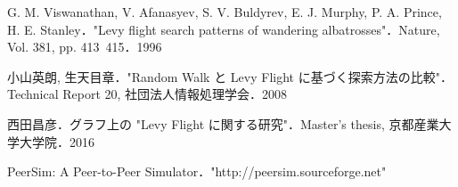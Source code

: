 \documentclass[11pt]{jreport}
\begin{document}
\begin{thebibliography}{99}
G. M. Viswanathan, V. Afanasyev, S. V. Buldyrev, E. J. Murphy, P. A. Prince, H. E. Stanley．"Levy flight search patterns of wandering albatrosses"．Nature, Vol. 381, pp. 413~415．1996

小山英朗, 生天目章．"Random Walk と Levy Flight に基づく探索方法の比較"． Technical Report 20, 社団法人情報処理学会．2008

西田昌彦．グラフ上の "Levy Flight に関する研究"．Master’s thesis, 京都産業大学大学院．2016

PeerSim: A Peer-to-Peer Simulator．"http://peersim.sourceforge.net"

\end{thebibliography}
\end{document}
